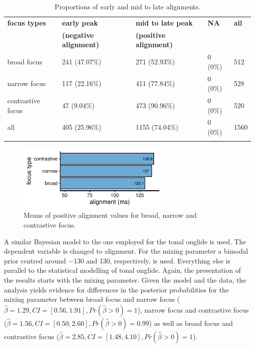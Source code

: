 \begin{table}
\caption{Proportions of early and mid to late alignments.}
\begin{tabularx}{\textwidth}{Xllll}
	\lsptoprule
\textbf{focus types	} &	\textbf{early peak}&		\textbf{mid to late peak} &		\textbf{NA} & 	\textbf{all}\\
&				\textbf{(negative alignment)} &	\textbf{(positive alignment)} &		&			\\	
\midrule
broad focus &		241 (47.07\%) & 				271 (52.93\%)  & 					0 (0\%) &			512	\\
\midrule
narrow focus &		117 (22.16\%)  &				411 (77.84\%) & 					0 (0\%)  &			528 \\
\midrule
contrastive focus &		47 (9.04\%)  &					473 (90.96\%) &						0 (0\%) &			520 \\
\midrule
all &				405 (25.96\%) &					1155 (74.04\%)  &					0 (0\%) &			1560	\\\lspbottomrule
\end{tabularx}
\label{tab:props_alignment}
\end{table}%

\begin{figure}
\includegraphics[width=7.5cm]{figures/ch6/alignment_mid_late_means.pdf}
\caption{Means of positive alignment values for broad, narrow and contrastive focus.}
\label{fig:alignment_means}
\end{figure}

A similar Bayesian model to the one employed for the tonal onglide is used. The dependent variable is changed to alignment. For the mixing parameter a bimodal prior centred around −130 and 130, respectively, is used. Everything else is parallel to the statistical modelling of tonal onglide. Again, the presentation of the results starts with the mixing parameter. Given the model and the data, the analysis yields evidence for differences in the posterior probabilities for the mixing parameter between broad focus and narrow focus ($\hat\beta=1.29 , CI=[0.56, 1.91], \allowbreak Pr(\hat\beta>0)=1$), narrow focus and contrastive focus ($\hat\beta=1.56, CI=[0.50, 2.60],\allowbreak Pr (\hat\beta>0)=0.99$) as well as broad focus and contrastive focus ($\hat\beta = 2.85, CI=[1.48, 4.10], \allowbreak Pr(\hat\beta>0)=1$).

